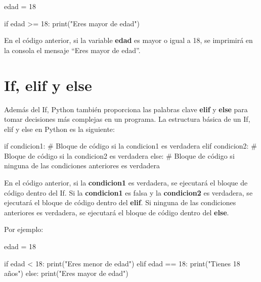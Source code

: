 \documentclass[
  a4paper,
  DIV=11,
  numbers=noendperiod,
  onepage,
  openany]{scrreprt}
\newenvironment{Shaded}{\begin{snugshade}}{\end{snugshade}}
\newcommand{\BuiltInTok}[1]{\textcolor[rgb]{0.00,0.23,0.31}{#1}}
\newcommand{\CommentTok}[1]{\textcolor[rgb]{0.37,0.37,0.37}{#1}}
\newcommand{\ControlFlowTok}[1]{\textcolor[rgb]{0.00,0.23,0.31}{#1}}
\newcommand{\DecValTok}[1]{\textcolor[rgb]{0.68,0.00,0.00}{#1}}
\newcommand{\NormalTok}[1]{\textcolor[rgb]{0.00,0.23,0.31}{#1}}
\newcommand{\OperatorTok}[1]{\textcolor[rgb]{0.37,0.37,0.37}{#1}}
\newcommand{\StringTok}[1]{\textcolor[rgb]{0.13,0.47,0.30}{#1}}
\begin{document}
\begin{Shaded}
\begin{Highlighting}[]
\NormalTok{edad }\OperatorTok{=} \DecValTok{18}

\ControlFlowTok{if}\NormalTok{ edad }\OperatorTok{\textgreater{}=} \DecValTok{18}\NormalTok{:}
    \BuiltInTok{print}\NormalTok{(}\StringTok{"Eres mayor de edad"}\NormalTok{)}
\end{Highlighting}
\end{Shaded}

En el código anterior, si la variable \textbf{edad} es mayor o igual a
18, se imprimirá en la consola el mensaje ``Eres mayor de edad''.

\section{If, elif y else}\label{if-elif-y-else}

Además del If, Python también proporciona las palabras clave
\textbf{elif} y \textbf{else} para tomar decisiones más complejas en un
programa. La estructura básica de un If, elif y else en Python es la
siguiente:

\begin{Shaded}
\begin{Highlighting}[]
\ControlFlowTok{if}\NormalTok{ condicion1:}
    \CommentTok{\# Bloque de código si la condicion1 es verdadera}
\ControlFlowTok{elif}\NormalTok{ condicion2:}
    \CommentTok{\# Bloque de código si la condicion2 es verdadera}
\ControlFlowTok{else}\NormalTok{:}
    \CommentTok{\# Bloque de código si ninguna de las condiciones anteriores es verdadera}
\end{Highlighting}
\end{Shaded}

En el código anterior, si la \textbf{condicion1} es verdadera, se
ejecutará el bloque de código dentro del If. Si la \textbf{condicion1}
es falsa y la \textbf{condicion2} es verdadera, se ejecutará el bloque
de código dentro del \textbf{elif}. Si ninguna de las condiciones
anteriores es verdadera, se ejecutará el bloque de código dentro del
\textbf{else}.

Por ejemplo:

\begin{Shaded}
\begin{Highlighting}[]
\NormalTok{edad }\OperatorTok{=} \DecValTok{18}

\ControlFlowTok{if}\NormalTok{ edad }\OperatorTok{\textless{}} \DecValTok{18}\NormalTok{:}
    \BuiltInTok{print}\NormalTok{(}\StringTok{"Eres menor de edad"}\NormalTok{)}
\ControlFlowTok{elif}\NormalTok{ edad }\OperatorTok{==} \DecValTok{18}\NormalTok{:}
    \BuiltInTok{print}\NormalTok{(}\StringTok{"Tienes 18 años"}\NormalTok{)}
\ControlFlowTok{else}\NormalTok{:}
    \BuiltInTok{print}\NormalTok{(}\StringTok{"Eres mayor de edad"}\NormalTok{)}
\end{Highlighting}
\end{Shaded}
\end{document}
